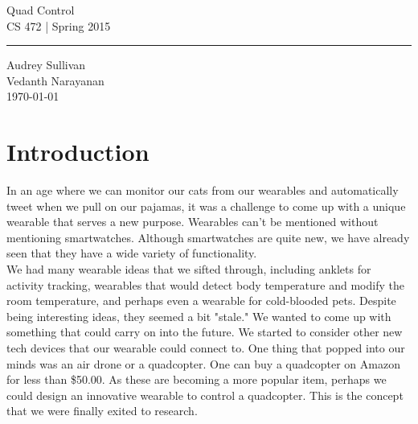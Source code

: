 \documentclass[12pt,letterpaper]{article}
\begin{document}
\begin{titlepage}
    \vspace*{4cm}
    \begin{flushright}
    {\huge
        Quad Control\\[5mm]
    }
    {\large
        CS 472 | Spring 2015
     }
    \end{flushright}
\hrule
    \begin{flushright}
	Audrey Sullivan\\
	Vedanth Narayanan\\
    \vfill
	\today\\
    \end{flushright}
\end{titlepage}

\raggedright

\section*{Introduction}
\hspace{1cm}In an age where we can monitor our cats from our wearables and automatically tweet when we pull on our pajamas, it was a challenge to come up with a unique wearable that serves a new purpose. Wearables can't be mentioned without mentioning smartwatches. Although smartwatches are quite new, we have already seen that they have a wide variety of functionality.\\
\hspace{1cm}We had many wearable ideas that we sifted through, including anklets for activity tracking, wearables that would detect body temperature and modify the room temperature, and perhaps even a wearable for cold-blooded pets. Despite being interesting ideas, they seemed a bit "stale." We wanted to come up with something that could carry on into the future. We started to consider other new tech devices that our wearable could connect to. One thing that popped into our minds was an air drone or a quadcopter. One can buy a quadcopter on Amazon for less than \$50.00. As these are becoming a more popular item, perhaps we could design an innovative wearable to control a quadcopter. This is the concept that we were finally exited to research.
\end{document}
